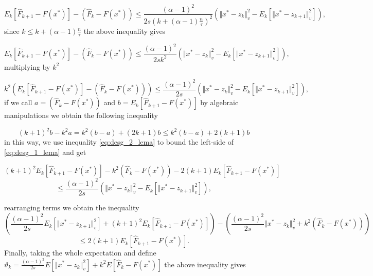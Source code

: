 \documentclass{article}
\newcommand{\x}{x^*}
\begin{document}
\begin{equation*}
E_k \left[\hat{F}_{k+1} - F(\x) \right] - \left(\hat{F}_k - F(\x) \right) \leq \frac{(\alpha-1)^2}{2s\left( k+(\alpha-1)\frac{n}{\tau}\right)^2} \left( \Vert \x - z_k \Vert^2_v - E_k \left[ \Vert \x - z_{k+1} \Vert_v^2 \right] \right),
\end{equation*}
since $k \leq k+(\alpha-1)\frac{n}{\tau}$ the above inequality gives 

\begin{equation*}
E_k \left[\hat{F}_{k+1} - F(\x) \right] - \left(\hat{F}_k - F(\x) \right) \leq \frac{(\alpha-1)^2}{2sk^2} \left( \Vert \x - z_k \Vert^2_v - E_k \left[ \Vert \x - z_{k+1} \Vert_v^2 \right] \right),
\end{equation*}
multiplying by $k^2$ 

\begin{equation}
\label{eq:desg_1_lema}
k^2 \left( E_k \left[\hat{F}_{k+1} - F(\x) \right] - \left(\hat{F}_k - F(\x) \right) \right) \leq \frac{(\alpha-1)^2}{2s}\left( \Vert \x - z_k \Vert^2_v - E_k \left[ \Vert \x - z_{k+1} \Vert_v^2 \right] \right),
\end{equation}
if we call $ a = \left(\hat{F}_k-F(\x) \right) $ and $ b = E_k[\hat{F}_{k+1}-F(\x)]  $ by algebraic manipulations we obtain the following inequality 

\begin{equation}
\label{eq:desg_2_lema}
(k+1)^2b - k^2a = k^2(b-a) + (2k+1)b \leq k^2(b-a) + 2(k+1)b
\end{equation}
in this way, we use inequality \eqref{eq:desg_2_lema} to bound the left-side of \eqref{eq:desg_1_lema}  and get

\begin{equation*}
(k+1)^2 E_k \left[\hat{F}_{k+1} - F(\x)\right] - k^2 \left(\hat{F}_k - F(\x) \right) -2(k+1) E_k \left[\hat{F}_{k+1} - F(\x)\right] 
\end{equation*}
\begin{equation*}
\leq \frac{(\alpha-1)^2}{2s}\left( \Vert \x - z_k \Vert^2_v - E_k \left[ \Vert \x - z_{k+1} \Vert_v^2 \right] \right),
\end{equation*}


rearranging terms we obtain the inequality
\begin{equation*}
\label{eq:desg_3_lema}
\left(\frac{(\alpha-1)^2}{2s}E_k[\Vert \x -z_{k+1} \Vert_v^2 ] + (k+1)^2E_k[\hat{F}_{k+1}-F(\x)]\right) -\left( \frac{(\alpha-1)^2}{2s}\Vert \x -z_k \Vert_v^2  + k^2\left(\hat{F}_k - F(\x)\right) \right)
\end{equation*}
\begin{equation*}
 \leq  2(k+1)E_k[\hat{F}_{k+1}-F(\x)].
\end{equation*}
Finally, taking the whole expectation and define $\vartheta_k = \frac{(\alpha-1)^2}{2s} E \left[\Vert \x - z_k \Vert_v^2 \right] + k^2E \left[\hat{F}_k - F(\x) \right]$ the above inequality gives
\end{document}
